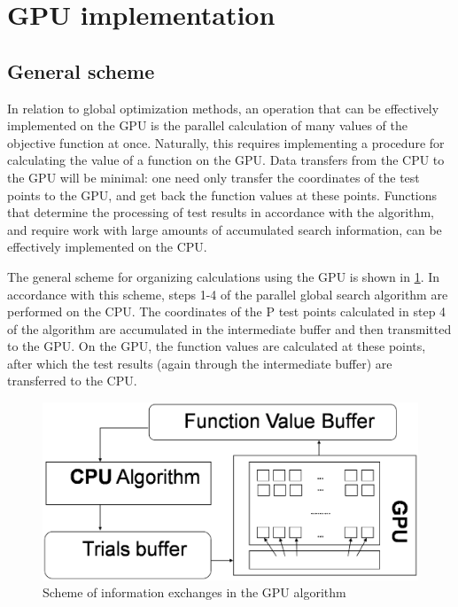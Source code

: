 \documentclass{svproc}
\begin{document}
\section{GPU implementation}

\subsection{General scheme}

In relation to global optimization methods, an operation that can be effectively implemented on the GPU is the parallel calculation of many values of the objective function at once. Naturally, this requires implementing a procedure for calculating the value of a function on the GPU. Data transfers from the CPU to the GPU will be minimal: one need only transfer the coordinates of the test points to the GPU, and get back the function values at these points. Functions that determine the processing of test results in accordance with the algorithm, and require work with large amounts of accumulated search information, can be effectively implemented on the CPU.

   The general scheme for organizing calculations using the GPU is shown in \ref{fig:GPU_Algorithm}. In accordance with this scheme, steps 1-4 of the parallel global search algorithm are performed on the CPU. The coordinates of the P test points calculated in step 4 of the algorithm are accumulated in the intermediate buffer and then transmitted to the GPU. On the GPU, the function values are calculated at these points, after which the test results (again through the intermediate buffer) are transferred to the CPU.
   
   \begin{figure}[h!]
    \centering
		\includegraphics[width=1.0\textwidth]{GPU_Algorithm.eps}
		\caption{Scheme of information exchanges in the GPU algorithm}\label{fig:GPU_Algorithm}
\end{figure}
\end{document}
